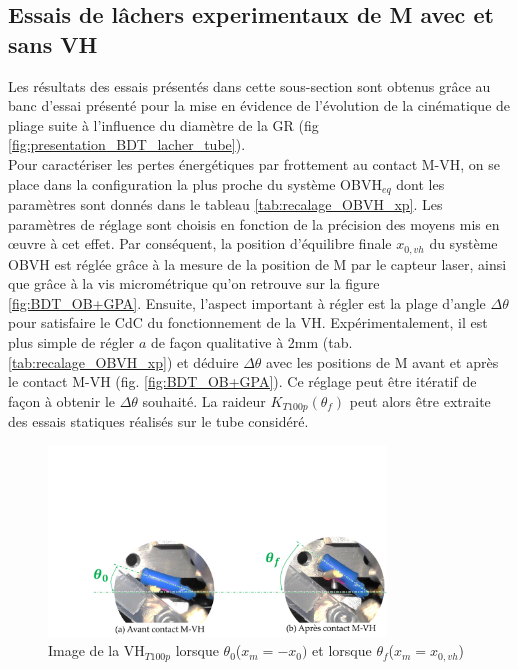 	\subsection{Essais de lâchers experimentaux de M avec et sans VH}
	\label{subsec:6.2.2_Essais de lacher experimentaux de M avec et sans VH}
Les résultats des essais présentés dans cette sous-section sont obtenus grâce au banc d'essai présenté pour la mise en évidence de l'évolution de la cinématique de pliage suite à l'influence du diamètre de la GR (fig \ref{fig:presentation_BDT_lacher_tube}).\\	
Pour caractériser les pertes énergétiques par frottement au contact M-VH, on se place dans la configuration la plus proche du système OBVH$_{eq}$ dont les paramètres sont donnés dans le tableau \ref{tab:recalage_OBVH_xp}. Les paramètres de réglage sont choisis en fonction de la précision des moyens mis en \oe{}uvre à cet effet. Par conséquent, la position d'équilibre finale $x_{0,vh}$ du système OBVH est réglée grâce à la mesure de la position de M par le capteur laser, ainsi que grâce à la vis micrométrique qu'on retrouve sur la figure \ref{fig:BDT_OB+GPA}. Ensuite, l'aspect important à régler est la plage d'angle $\Delta\theta$ pour satisfaire le CdC du fonctionnement de la VH. Expérimentalement, il est plus simple de régler $a$ de façon qualitative à 2mm (tab. \ref{tab:recalage_OBVH_xp}) et déduire $\Delta\theta$ avec les positions de M avant et après le contact M-VH (fig. \ref{fig:BDT_OB+GPA}). Ce réglage peut être itératif de façon à obtenir le $\Delta\theta$ souhaité. La raideur $K_{T100p}(\theta_f)$ peut alors être extraite des essais statiques réalisés sur le tube considéré.  
\begin{figure}[!htbp]
	\begin{center}
		\captionsetup{justification=centering}
		\includegraphics[trim={4cm 0cm 0cm 9.5cm},clip,width=0.8\textwidth]{../Chap6/Figure/contact_M_VH_lachers.pdf}
		\caption{Image de la VH$_{T100p}$ lorsque $\theta_0$($x_m=-x_{0})$ et lorsque $\theta_f$($x_m=x_{0,vh}$)}
		\label{fig:contact_M_VH_lachers}
	\end{center}
\end{figure}

